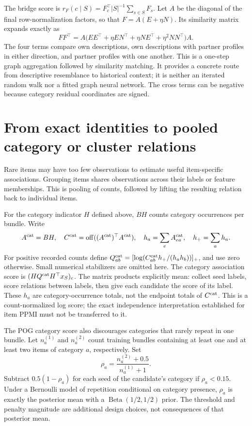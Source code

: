 \documentclass[11pt,a4paper]{article}
\newcommand{\off}{\operatorname{off}}
\begin{document}
The bridge score is $r_F(c\mid S)=F_c^\top |S|^{-1}\sum_{s\in S}F_s$.
Let $A$ be the diagonal of the final row-normalization factors, so that
$F=A(E+\eta N)$. Its similarity matrix expands exactly as
\begin{equation}
 FF^\top=A\bigl(EE^\top+\eta EN^\top+\eta NE^\top+
                   \eta^2 NN^\top\bigr)A.
\end{equation}
The four terms compare own descriptions, own descriptions with partner
profiles in either direction, and partner profiles with one another.
This is a one-step graph aggregation followed by similarity matching.
It provides a concrete route from descriptive resemblance to historical
context; it is neither an iterated random walk nor a fitted graph neural network.
The cross terms can be negative because category residual coordinates are signed.

\section{From exact identities to pooled category or cluster relations}
Rare items may have too few observations to estimate useful item-specific
associations. Grouping items shares observations across their labels or
feature memberships. This is pooling of counts, followed by lifting the
resulting relation back to individual items.

For the category indicator $H$ defined above, $BH$ counts category occurrences
per bundle. Write
\[
 A^{\rm cat}=BH,\quad C^{\rm cat}=\off((A^{\rm cat})^\top A^{\rm cat}),\quad
 h_a=\sum_e A^{\rm cat}_{ea},\quad h_+=\sum_a h_a.
\]
For positive recorded counts define
$Q^{\rm cat}_{ab}=[\log(C^{\rm cat}_{ab}h_+/(h_a h_b))]_+$, and use zero
otherwise. Small numerical stabilizers are omitted here.
The category association score is $(H Q^{\rm cat} H^\top x_S)_c$.
The matrix products explicitly mean: collect seed labels, score relations
between labels, then give each candidate the score of its label.
These $h_a$ are category-occurrence totals, not the endpoint totals of
$C^{\rm cat}$. This is a count-normalized log score; the exact independence
interpretation established for item PPMI must not be transferred to it.

The POG category score also discourages categories that rarely repeat in one
bundle. Let $n_a^{(1)}$ and $n_a^{(2)}$ count training bundles containing at
least one and at least two items of category $a$, respectively. Set
\[
 \rho_a=\frac{n_a^{(2)}+0.5}{n_a^{(1)}+1}.
\]
Subtract $0.5(1-\rho_a)$ for each seed of the candidate's category if
$\rho_a<0.15$. Under a Bernoulli model of repetition conditional on category
presence, $\rho_a$ is exactly the posterior mean with a
$\operatorname{Beta}(1/2,1/2)$ prior. The threshold and penalty magnitude
are additional design choices, not consequences of that posterior mean.
\end{document}
